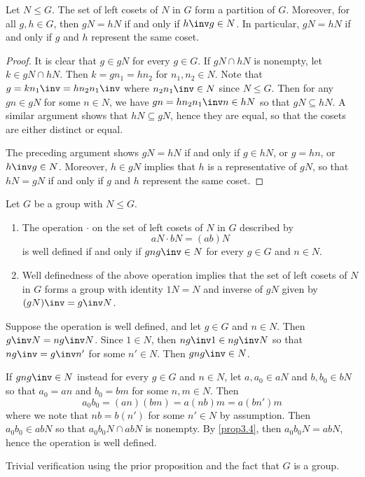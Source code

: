  \label{prop3.4}
Let $N \leq G$. The set of left cosets of $N$ in $G$ form a partition of $G$. Moreover, for all $g, h \in G$, then $gN = hN$ if and only if $h\inv g \in N$. In particular, $gN = hN$ if and only if $g$ and $h$ represent the same coset.

\begin{proof}
    It is clear that $g \in gN$ for every $g \in G$. If $gN \cap hN$ is nonempty, let $k \in gN \cap hN$. Then $k = gn_1 = hn_2$ for $n_1, n_2 \in N$. Note that $g = kn_1\inv = hn_2n_1\inv$ where $n_2n_1\inv \in N$ since $N \leq G$. Then for any $gn \in gN$ for some $n \in N$, we have $gn = hn_2n_1\inv n \in hN$ so that $gN \subseteq hN$. A similar argument shows that $hN \subseteq gN$, hence they are equal, so that the cosets are either distinct or equal.

    The preceding argument shows $gN = hN$ if and only if $g \in hN$, or $g = hn$, or $h\inv g \in N$. Moreover, $h \in gN$ implies that $h$ is a representative of $gN$, so that $hN = gN$ if and only if $g$ and $h$ represent the same coset.
\end{proof}

 \label{prop3.5}
Let $G$ be a group with $N \leq G$.
\begin{enumerate}
    \item The operation $\cdot$ on the set of left cosets of $N$ in $G$ described by
    \[aN \cdot bN = (ab)N\]
    is well defined if and only if $gng\inv \in N$ for every $g \in G$ and $n \in N$.
    \item Well definedness of the above operation implies that the set of left cosets of $N$ in $G$ forms a group with identity $1N = N$ and inverse of $gN$ given by $(gN)\inv = g\inv N$.
\end{enumerate}

\begin{proofnum}
    \item Suppose the operation is well defined, and let $g \in G$ and $n \in N$. Then $g\inv N = ng\inv N$. Since $1 \in N$, then $ng\inv 1 \in ng\inv N$ so that $ng\inv = g\inv n'$ for some $n' \in N$. Then $gng\inv \in N$.
    
    If $gng\inv \in N$ instead for every $g \in G$ and $n \in N$, let $a, a_0 \in aN$ and $b, b_0 \in bN$ so that $a_0 = an$ and $b_0 = bm$ for some $n, m \in N$. Then
    \[a_0b_0 = (an)(bm) = a(nb)m = a(bn')m\]
    where we note that $nb = b(n')$ for some $n' \in N$ by assumption. Then $a_0b_0 \in abN$ so that $a_0b_0N \cap abN$ is nonempty. By \autoref{prop3.4}, then $a_0b_0N = abN$, hence the operation is well defined.
    \item Trivial verification using the prior proposition and the fact that $G$ is a group.
\end{proofnum}

